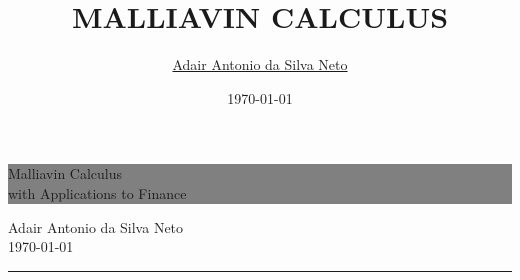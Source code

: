 \documentclass[12pt,a4paper,twoside]{report}
\author{\sffamily \href{https://github.com/adairneto}{Adair Antonio da Silva Neto}}
\title{\sffamily \uppercase{Malliavin Calculus}}
\date{\sffamily \today}
\begin{document}

\begin{titlepage} %
	
	
	\colorbox{grey}{
		\parbox[t]{0.93\textwidth}{ %
			\parbox[t]{0.91\textwidth}{ %
				\raggedleft %
				\fontsize{50pt}{80pt}\selectfont %
				\vspace{0.7cm} %
				
				Malliavin Calculus\\
				with Applications to Finance
				
				\vspace{0.7cm} %
			}
		}
	}
	
	\vfill %
	
	
	\parbox[t]{0.93\textwidth}{ %
		\raggedleft %
		\large %
		{\Large Adair Antonio da Silva Neto}\\[4pt] %
		\today \\
		
		\hfill\rule{0.2\linewidth}{1pt}%
	}
	
\end{titlepage}

\tableofcontents
\thispagestyle{empty}
\setcounter{page}{1}
\end{document}
